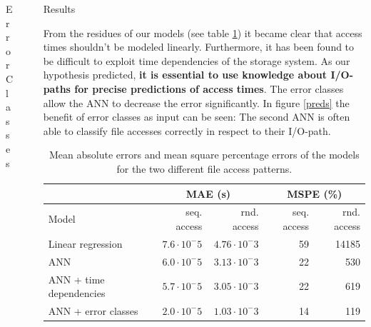 \documentclass[final]{beamer}
\newlength{\sepwid}
\newlength{\onecolwid}
\begin{document}
\begin{frame}[t]
\begin{columns}[t]
\begin{column}{\onecolwid}
\begin{block}{Error Classes}

\end{block}

\end{column} %

\begin{column}{\sepwid}\end{column} %

\begin{column}{\onecolwid} %

\begin{block}{Results}
	
	From the residues of our models (see table \ref{residues}) it became clear that access times shouldn't be modeled linearly.
	Furthermore, it has been found to be difficult to exploit time dependencies of the storage system.
	As our hypothesis predicted, \textbf{it is essential to use knowledge about I/O-paths for precise predictions of access times}.
	The error classes allow the ANN to decrease the error significantly.
	In figure \ref{preds} the benefit of error classes as input can be seen:
	The second ANN is often able to classify file accesses correctly in respect to their I/O-path.
	
	\begin{table}
		\scriptsize
		\vspace{0.2cm}
		\begin{tabular}{l|r|r|r|r}%
			&  \multicolumn{2}{|c}{MAE (s)}&  \multicolumn{2}{|c}{MSPE (\%)}\\ \hline
			Model & seq. access & rnd. access & seq. access & rnd. access\\ \hline
			Linear regression & $7.6\cdot 10^-5$ & $4.76\cdot 10^-3$ & 59 & 14185  \\
			ANN & $6.0\cdot 10^-5$ & $3.13\cdot 10^-3$ & 22 & 530 \\
			ANN + time dependencies & $5.7\cdot 10^-5$ & $3.05\cdot 10^-3$ & 22 & 619\\
			ANN + error classes & $2.0\cdot 10^-5$ & $1.03\cdot 10^-3$ & 14 & 119\\
		\end{tabular}
		\caption{Mean absolute errors and mean square percentage errors of the models for the two different file access patterns.}
		\label{residues}
	\end{table}
	

\end{block}
\end{column}
\end{columns}
\end{frame}
\end{document}
